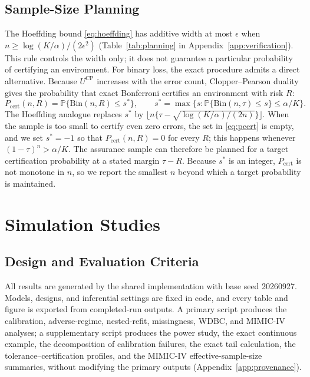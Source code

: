 \documentclass[twoside,11pt]{article}
\newcommand{\Pp}{\mathbb P}
\begin{document}
\subsection{Sample-Size Planning}
\label{sec:planning}
The Hoeffding bound \eqref{eq:hoeffding} has additive width at most $\epsilon$ when
$n\geq\log(K/\alpha)/(2\epsilon^2)$ (Table~\ref{tab:planning} in Appendix~\ref{app:verification}).
This rule controls the width only; it does not guarantee a particular probability of
certifying an environment. For binary loss, the exact procedure admits a direct alternative.
Because $U^{\mathrm{CP}}$ increases with the error count, Clopper--Pearson duality gives the
probability that exact Bonferroni certifies an environment with risk $R$:
\begin{equation}
P_{\mathrm{cert}}(n,R)=\Pp\{\mathrm{Bin}(n,R)\leq s^*\},\qquad
s^*=\max\bigl\{s:\Pp\{\mathrm{Bin}(n,\tau)\leq s\}\leq\alpha/K\bigr\}.
\label{eq:pcert}
\end{equation}
The Hoeffding analogue replaces $s^*$ by $\lfloor n\{\tau-\sqrt{\log(K/\alpha)/(2n)}\}\rfloor$.
When the sample is too small to certify even zero errors, the set in \eqref{eq:pcert} is
empty, and we set $s^*=-1$ so that $P_{\mathrm{cert}}(n,R)=0$ for every $R$; this happens
whenever $(1-\tau)^n>\alpha/K$. The assurance sample can therefore be planned for a target certification probability at a
stated margin $\tau-R$. Because $s^*$ is an integer, $P_{\mathrm{cert}}$ is not monotone in
$n$, so we report the smallest $n$ beyond which a target probability is maintained.

\section{Simulation Studies}
\label{sec:simulation}

\subsection{Design and Evaluation Criteria}
\label{sec:experiments}
All results are generated by the shared implementation with base seed 20260927. Models,
designs, and inferential settings are fixed in code, and every table and figure is exported
from completed-run outputs. A primary script produces the calibration, adverse-regime,
nested-refit, missingness, WDBC, and MIMIC-IV analyses; a supplementary script produces the
power study, the exact continuous example, the decomposition of calibration failures, the
exact tail calculation, the tolerance--certification profiles, and the MIMIC-IV
effective-sample-size summaries, without modifying the primary outputs
(Appendix~\ref{app:provenance}).
\end{document}
